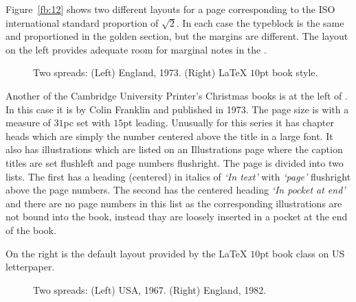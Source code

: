\documentclass[10pt,letterpaper,extrafontsizes]{memoir}
\begin{document}
    Figure~\ref{fb:12} shows two different layouts for a page corresponding
to the ISO international standard proportion of $\sqrt{2}$. In each case
the typeblock is the same and proportioned in the 
golden section, but the margins are 
different. The layout on the left provides adequate
room for marginal notes in the \foredge.


\begin{figure}
\centering
\begin{minipage}[b]{\pwlayi}
\end{minipage}
\hfill
\begin{minipage}[b]{\pwlayi}
\end{minipage}
\caption[Two spreads: England, 1973 and LaTeX $10pt$ book style]%
        {Two spreads: (Left) England, 1973.
         (Right) LaTeX $10$pt book style.} \label{fb:13}
\end{figure}

    Another of the Cambridge University 
Printer's Christmas books 
is at the left
of . In this case it is  by Colin Franklin and published in 1973. The
page size is  with a measure of $31$pc set with
$15$pt leading.  Unusually for this series it has chapter 
heads which are simply the number centered above 
the title in a large font. It also has illustrations
which are listed on an Illustrations page where the caption
titles are set flushleft and page numbers flushright. The page is divided
into two lists. The first has a heading (centered) in italics of
\textit{`In text'} with \textit{`page'} flushright above the page numbers.
The second has the centered heading \textit{`In pocket at end'} and there
are no page numbers in this list as the corresponding illustrations
are not bound into the book, instead thay are loosely inserted in a 
pocket at the end of the book.


On the right is the default layout provided by the
LaTeX $10$pt book class on US letterpaper.

\begin{figure}
\centering
\begin{minipage}[b]{\pwlayi}
\end{minipage}
\hfill
\begin{minipage}[b]{\pwlayi}
\end{minipage}
\caption[Two spreads: USA, 1967 and England, 1982]%
        {Two spreads: (Left) USA, 1967.
         (Right) England, 1982.} \label{fb:14}
\end{figure}
\end{document}
